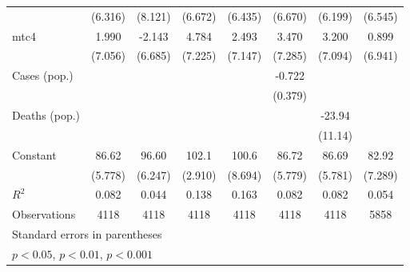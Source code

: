 \documentclass{article}
\begin{document}
{\begin{longtable}{l*{7}{c}}
                &  (6.316)         &  (8.121)         &  (6.672)         &  (6.435)         &  (6.670)         &  (6.199)         &  (6.545)         \\
mtc4            &    1.990         &   -2.143         &    4.784         &    2.493         &    3.470         &    3.200         &    0.899         \\
                &  (7.056)         &  (6.685)         &  (7.225)         &  (7.147)         &  (7.285)         &  (7.094)         &  (6.941)         \\
Cases (pop.)    &                  &                  &                  &                  &   -0.722         &                  &                  \\
                &                  &                  &                  &                  &  (0.379)         &                  &                  \\
Deaths (pop.)   &                  &                  &                  &                  &                  &   -23.94\sym{*}  &                  \\
                &                  &                  &                  &                  &                  &  (11.14)         &                  \\
Constant        &    86.62\sym{***}&    96.60\sym{***}&    102.1\sym{***}&    100.6\sym{***}&    86.72\sym{***}&    86.69\sym{***}&    82.92\sym{***}\\
                &  (5.778)         &  (6.247)         &  (2.910)         &  (8.694)         &  (5.779)         &  (5.781)         &  (7.289)         \\
\hline
\(R^{2}\)       &    0.082         &    0.044         &    0.138         &    0.163         &    0.082         &    0.082         &    0.054         \\
Observations    &     4118         &     4118         &     4118         &     4118         &     4118         &     4118         &     5858         \\
\hline\hline
\multicolumn{8}{l}{\footnotesize Standard errors in parentheses}\\
\multicolumn{8}{l}{\footnotesize \sym{*} \(p<0.05\), \sym{**} \(p<0.01\), \sym{***} \(p<0.001\)}\\
\end{longtable}
}
\end{document}
